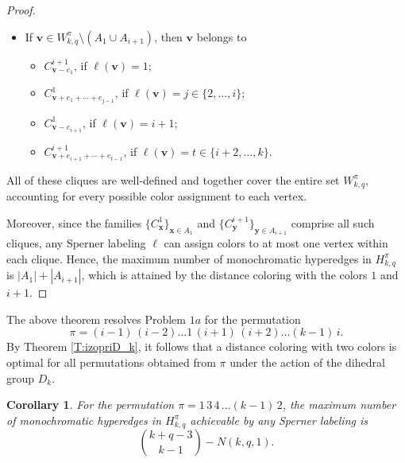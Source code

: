 \documentclass{birkjour}
\newtheorem{cor}[thm]{Corollary}
\theoremstyle{definition}
\theoremstyle{remark}
\numberwithin{equation}{section}
\begin{document}
\begin{proof}
\begin{itemize}
\item If \(\mathbf{v} \in W^\pi_{k,q} \setminus (A_1 \cup
A_{i+1})\), then \(\mathbf{v}\) belongs to
\begin{itemize}
    \item \(C^{i+1}_{\mathbf{v} - e_1}\), if \(\ell(\mathbf{v}) = 1\);
    \item \(C^{1}_{\mathbf{v} + e_1 + \cdots + e_{j-1}}\), if \(\ell(\mathbf{v}) = j \in \{2, \ldots, i\}\);
    \item \(C^{1}_{\mathbf{v} - e_{i+1}}\), if \(\ell(\mathbf{v}) = i+1\);
    \item \(C^{i+1}_{\mathbf{v} + e_{i+1} + \cdots + e_{t-1}}\), if \(\ell(\mathbf{v}) = t \in \{i+2, \ldots, k\}\).
\end{itemize}
\end{itemize}



All of these cliques are well-defined and together cover the
entire set \(W^\pi_{k,q}\), accounting for every possible color
assignment to each vertex.

Moreover, since the families \(\{ C^1_\mathbf{x} \}_{\mathbf{x} \in A_1}\) and \(\{
C^{i+1}_\mathbf{y} \}_{\mathbf{y} \in A_{i+1}}\) comprise all such cliques, any
Sperner labeling \(\ell\) can assign colors to at most one vertex
within each clique. Hence, the maximum number of monochromatic
hyperedges in $H^\pi_{k,q}$ is $|A_1|+|A_{i+1}|$, which is
attained by the distance coloring with the colors $1$ and $i+1$.
\end{proof}
The above theorem resolves Problem $1a$ for the permutation
$$\pi=(i-1)\, (i-2)\ldots 1\,  (i+1)\, (i+2)\ldots (k-1)\, i.$$ By
Theorem \ref{T:izopriD_k}, it follows that a distance coloring
with two colors is optimal for all permutations obtained from
$\pi$ under the action of the dihedral group $D_k$.
\begin{cor}
For the permutation $\pi=1\, 3\, 4\, \ldots (k-1)\, 2$, the
maximum number of monochromatic hyperedges in $H^\pi_{k,q}$
achievable by any Sperner labeling is
$${k+q-3\choose k-1}- N(k,q,1).$$
\end{cor}
\end{document}

